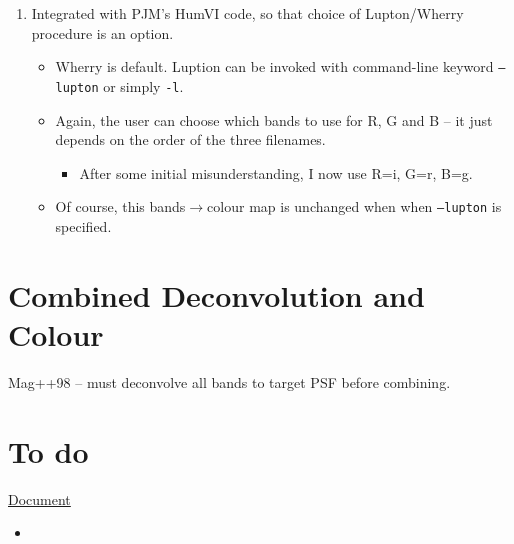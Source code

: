 \documentclass[letterpaper, 11pt]{article}
\def\MORE{{\color{red}{\bf MORE}}\xspace}
\begin{document}
\begin{enumerate}
\begin{itemize}
	\end{itemize}
	\item Integrated with PJM's HumVI code, so that choice of Lupton/Wherry procedure is an option.
	\begin{itemize}
		\item Wherry is default. Luption can be invoked with command-line keyword \texttt{--lupton} or simply \texttt{-l}.
		\item Again, the user can choose which bands to use for R, G and B -- it just depends on the order of the three filenames.
		\begin{itemize}
			\item After some initial misunderstanding, I now use R=i, G=r, B=g.
		\end{itemize}
		\item Of course, this bands$\rightarrow$colour map is unchanged when when \texttt{--lupton} is specified.
	\end{itemize}
\end{enumerate}





\section{Combined Deconvolution and Colour}

Mag++98 -- must deconvolve all bands to target PSF before combining.



\section{To do}

\underline{Document}
\begin{itemize}
	\item 
\end{itemize}
\end{document}
